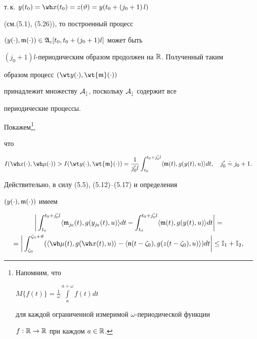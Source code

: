 т.\,к. $y(t_0)=\wh x(t_0)=z(\vartheta)=y(t_0+(j_0+1)\,l)$


(см.(5.1), (5.26)), то построенный процесс


$(y(\cdot),\frak m(\cdot))\in\frak A_c[t_0,t_0+(j_0+1)l]$ может быть


$(j_0+1)l$-периодическим образом продолжен на $\Bbb R$. Полученный таким


образом процесс $(\wt y(\cdot),\wt{\frak m}(\cdot))$


принадлежит множеству $\cal A_c$, поскольку $\cal A_c$ содержит все


периодические процессы.





Покажем\footnote{Напомним, что


$M\{f(t)\}=\frac{1}{\omega} \int\limits_{a}^{a+\omega}f(t) dt$


для каждой ограниченной измеримой $\omega$-периодической функции


$f:\Bbb R\to\Bbb R$ при каждом $a\in\Bbb R$.},


что \label{ftnt6}     %


\begin{equation}


I(\wh x(\cdot),\wh\mu(\cdot))>


I(\wt y(\cdot),\wt{\frak m}(\cdot))


=\frac{1}{j'_0l}\int_{t_0}^{t_0+j'_0l}\langle\frak m(t),


g(y(t),u)\rangle dt,


\quad j'_0\doteq j_0+1.


\end{equation}


Действительно, в силу (5.5), (5.12)--(5.17) и определения


$(y(\cdot),\frak m(\cdot))$ имеем


\begin{multline*}


\bigg|\int_{t_0}^{t_0+j'_0l}\langle\frak m_{j_0}(t),


g(y_{j_0}(t),u)\rangle dt-


\int_{t_0}^{t_0+j'_0l} \langle\frak m(t),g(y(t),u)\rangle dt\bigg|=\\


=\bigg|\int_{\zeta_0}^{\zeta_0+\vartheta}(\langle\wh


\mu(t),g(\wh x(t),u)\rangle-


\langle\frak n(t-\zeta_0),g(z(t-\zeta_0),u)\rangle)dt\bigg|


\le\Bbb I_1+\Bbb I_2,


\end{multline*}


